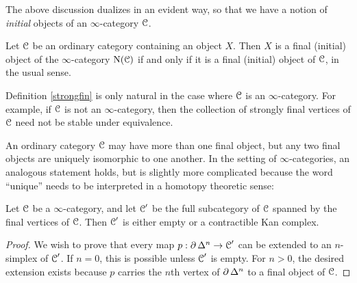 \begin{1.2.12 Initial and final objects}
\begin{remark}
The above discussion dualizes in an evident way, so that we have a notion of {\em initial} objects of an $\infty$-category $\operatorname{\mathcal{C}}$.
\end{remark}

\begin{example}
Let $\operatorname{\mathcal{C}}$ be an ordinary category containing an object $X$. Then $X$ is a final (initial)
object of the $\infty$-category $\operatorname{N}(\operatorname{\mathcal{C}})$ if and only if it is a final (initial) object of $\operatorname{\mathcal{C}}$, in the usual sense.
\end{example}

\begin{remark}
Definition \ref{strongfin} is only natural in the case where $\operatorname{\mathcal{C}}$ is an $\infty$-category. For example, if $\operatorname{\mathcal{C}}$ is not an $\infty$-category, then the collection of strongly final vertices of $\operatorname{\mathcal{C}}$ need not be stable under equivalence.
\end{remark}

An ordinary category $\operatorname{\mathcal{C}}$ may have more than one final object,
but any two final objects are uniquely isomorphic to one another.
In the setting of $\infty$-categories, an analogous statement holds,
but is slightly more complicated because the word ``unique'' needs to be
interpreted in a homotopy theoretic sense:

\begin{proposition}[Joyal]\label{initunique}
Let $\operatorname{\mathcal{C}}$ be a $\infty$-category, and let $\operatorname{\mathcal{C}}'$ be the full subcategory
of $\operatorname{\mathcal{C}}$ spanned by the final vertices of $\operatorname{\mathcal{C}}$. Then $\operatorname{\mathcal{C}}'$ is either empty or
a contractible Kan complex.
\end{proposition}

\begin{proof}
We wish to prove that every map $p: \operatorname{\partial} \Delta^n \rightarrow \operatorname{\mathcal{C}}'$
can be extended to an $n$-simplex of $\operatorname{\mathcal{C}}'$. If $n = 0$, this is
possible unless $\operatorname{\mathcal{C}}'$ is empty. For $n > 0$, the desired extension exists
because $p$ carries the $n$th vertex of $\operatorname{\partial} \Delta^n$ to a final
object of $\operatorname{\mathcal{C}}$.
\end{proof}
\end{1.2.12 Initial and final objects}
